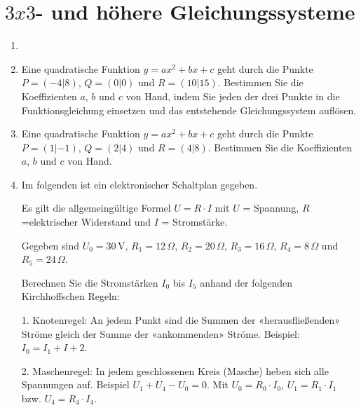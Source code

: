 \section{$3x3$- und höhere Gleichungssysteme}

\begin{enumerate}[label=\alph*)]
\item
{}
\item
Eine quadratische Funktion $y=ax^2 + bx + c$ geht durch die Punkte
$P=(-4|8)$, $Q=(0|0)$ und $R=(10|15)$. Bestimmen Sie die Koeffizienten
$a$, $b$ und $c$ von Hand, indem Sie jeden der drei Punkte in die
Funktionsgleichung einsetzen und das entstehende Gleichungssystem
auf\/lösen.

\item
Eine quadratische Funktion $y=ax^2 + bx + c$ geht durch die Punkte
$P=(1|-1)$, $Q=(2|4)$ und $R=(4|8)$. Bestimmen Sie die Koeffizienten
$a$, $b$ und $c$ von Hand.

\item
Im folgenden ist ein elektronischer Schaltplan gegeben.


Es gilt die allgemeingültige Formel $U=R\cdot{}I$ mit $U$ = Spannung,
$R$=elektrischer Widerstand und $I$ = Stromstärke.

Gegeben sind
$U_0 = 30\,\text{V}$, 
$R_1 = 12\,\Omega$,
$R_2 = 20\,\Omega$,
$R_3 = 16\,\Omega$,
$R_4 = 8\,\Omega$ und
$R_5 = 24\,\Omega$.

Berechnen Sie die Stromstärken $I_0$ bis $I_5$ anhand der folgenden
Kirchhoffschen Regeln:

1. Knotenregel: An jedem Punkt sind die Summen der «herausfließenden»
Ströme gleich der Summe der «ankommenden» Ströme. Beispiel: $I_0 = I_1
+ I+2$.

2. Maschenregel: In jedem geschlossenen Kreis (Masche) heben sich alle
Spannungen auf. Beispiel $U_1 + U_4 - U_0 = 0$. Mit
$U_0 = R_0 \cdot{} I_0$,
$U_1 = R_1 \cdot{} I_1$ bzw. 
$U_4 = R_4 \cdot{} I_4$.

\end{enumerate}
